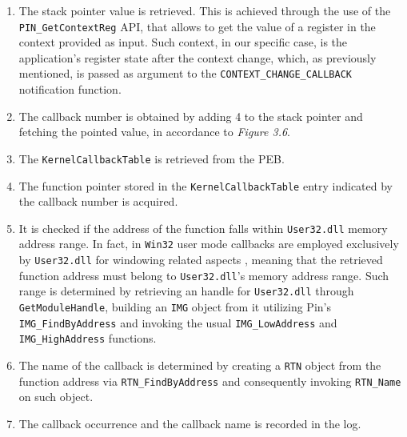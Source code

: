 \begin{enumerate}
\item The stack pointer value is retrieved. This is achieved through the use of the \texttt{PIN\_GetContextReg} API, that allows to get the value of a register in the context provided as input. Such context, in our specific case, is the application's register state after the context change, which, as previously mentioned, is passed as argument to the \texttt{CONTEXT\_CHANGE\_CALLBACK} notification function.
\item The callback number is obtained by adding 4 to the stack pointer and fetching the pointed value, in accordance to \textit{Figure 3.6}.
\item The \texttt{KernelCallbackTable} is retrieved from the PEB. 
\item The function pointer stored in the \texttt{KernelCallbackTable} entry indicated by the callback number is acquired.
\item It is checked if the address of the function falls within \texttt{User32.dll} memory address range. In fact, in \texttt{Win32} user mode callbacks are employed exclusively by \texttt{User32.dll} for windowing related aspects \cite{UCDispatcher}, meaning that the retrieved function address must belong to \texttt{User32.dll}'s memory address range. Such range is determined by retrieving an handle for \texttt{User32.dll} through \texttt{GetModuleHandle}, building an \texttt{IMG} object from it utilizing Pin's \texttt{IMG\_FindByAddress} and invoking the usual \texttt{IMG\_LowAddress} and \texttt{IMG\_HighAddress} functions. 
\item The name of the callback is determined by creating a \texttt{RTN} object from the function address via \texttt{RTN\_FindByAddress} and consequently invoking \texttt{RTN\_Name} on such object.
\item The callback occurrence and the callback name is recorded in the log.
\end{enumerate}


